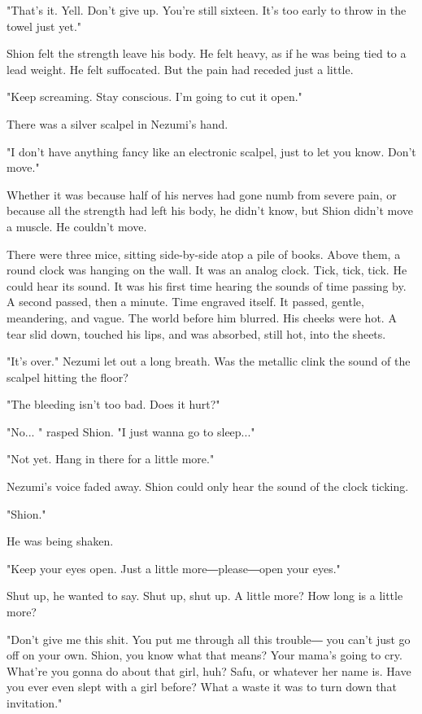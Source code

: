 "That's it. Yell. Don't give up. You're still sixteen. It's too early to
throw in the towel just yet."

Shion felt the strength leave his body. He felt heavy, as if he was
being tied to a lead weight. He felt suffocated. But the pain had
receded just a little.

"Keep screaming. Stay conscious. I'm going to cut it open."

There was a silver scalpel in Nezumi's hand.

"I don't have anything fancy like an electronic scalpel, just to let you
know. Don't move."

Whether it was because half of his nerves had gone numb from severe
pain, or because all the strength had left his body, he didn't know, but
Shion didn't move a muscle. He couldn't move.

There were three mice, sitting side-by-side atop a pile of books. Above
them, a round clock was hanging on the wall. It was an analog clock.
Tick, tick, tick. He could hear its sound. It was his first time hearing
the sounds of time passing by. A second passed, then a minute. Time
engraved itself. It passed, gentle, meandering, and vague. The world
before him blurred. His cheeks were hot. A tear slid down, touched his
lips, and was absorbed, still hot, into the sheets.

"It's over." Nezumi let out a long breath. Was the metallic clink the
sound of the scalpel hitting the floor?

"The bleeding isn't too bad. Does it hurt?"

"No... " rasped Shion. "I just wanna go to sleep..."

"Not yet. Hang in there for a little more."

Nezumi's voice faded away. Shion could only hear the sound of the clock
ticking.

"Shion."

He was being shaken.

"Keep your eyes open. Just a little more―please―open your eyes."

Shut up, he wanted to say. Shut up, shut up. A little more? How long is
a little more?

"Don't give me this shit. You put me through all this trouble― you can't
just go off on your own. Shion, you know what that means? Your mama's
going to cry. What're you gonna do about that girl, huh? Safu, or
whatever her name is. Have you ever even slept with a girl before? What
a waste it was to turn down that invitation."

